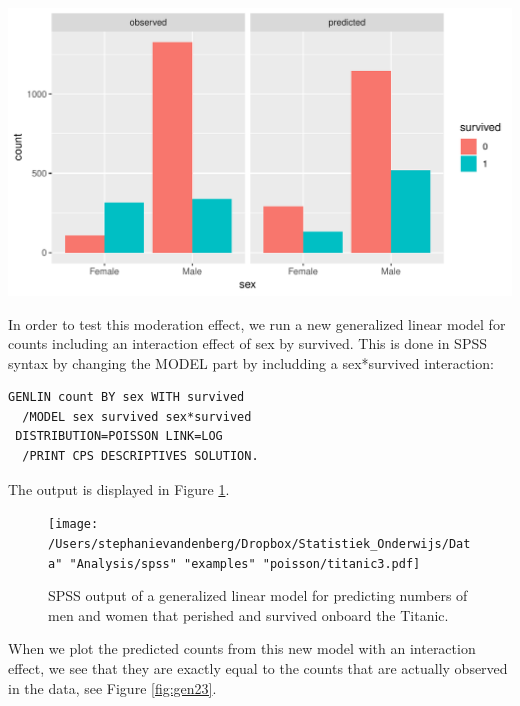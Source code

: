 \documentclass[]{book}\usepackage[]{graphicx}\usepackage[]{color}
\makeatletter
\def\maxwidth{ %
  \ifdim\Gin@nat@width>\linewidth
    \linewidth
  \else
    \Gin@nat@width
  \fi
}
\makeatother
\begin{document}
{\centering \includegraphics[width=\maxwidth]{figure/gen_22-1} 

}





In order to test this moderation effect, we run a new generalized linear model for counts including an interaction effect of sex by survived. This is done in SPSS syntax by changing the MODEL part by includding a sex*survived interaction:


\begin{verbatim}
GENLIN count BY sex WITH survived
  /MODEL sex survived sex*survived
 DISTRIBUTION=POISSON LINK=LOG
  /PRINT CPS DESCRIPTIVES SOLUTION.
\end{verbatim}


The output is displayed in Figure \ref{fig:titanic3}.


\begin{figure}[h]
    \begin{center}
       \texttt{[image: /Users/stephanievandenberg/Dropbox/Statistiek\_Onderwijs/Data" "Analysis/spss" "examples" "poisson/titanic3.pdf]}
    \end{center}
     \caption{SPSS output of a generalized linear model for predicting numbers of men and women that perished and survived onboard the Titanic.}
    \label{fig:titanic3}
\end{figure}



When we plot the predicted counts from this new model with an interaction effect, we see that they are exactly equal to the counts that are actually observed in the data, see Figure \ref{fig:gen23}.
\end{document}
